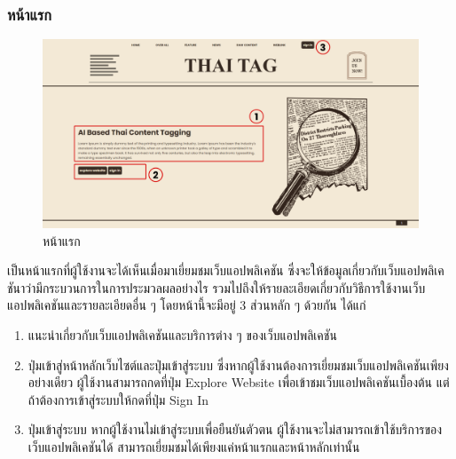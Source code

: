 \documentclass[12pt,oneside,openright,a4paper]{cpe-thai-project}
\begin{document}
\begin{itemize}
        \subsubsection{หน้าแรก}
          \begin{figure}[!ht]\centering
            \includegraphics[width=\textwidth]{./img/project_ui/4_1.png}
            \caption{หน้าแรก}\label{fig:exp_landing}
          \end{figure}
          \hspace{1cm}เป็นหน้าแรกที่ผู้ใช้งานจะได้เห็นเมื่อมาเยี่ยมชมเว็บแอปพลิเคชัน ซึ่งจะให้ข้อมูลเกี่ยวกับเว็บแอปพลิเคชันาว่ามีกระบวนการในการประมวลผลอย่างไร 
          รวมไปถึงให้รายละเอียดเกี่ยวกับวิธีการใช้งานเว็บแอปพลิเคชันและรายละเอียดอื่น ๆ โดยหน้านี้จะมีอยู่ 3 ส่วนหลัก ๆ ด้วยกัน ได้แก่
          \begin{enumerate}
            \item แนะนำเกี่ยวกับเว็บแอปพลิเคชันและบริการต่าง ๆ ของเว็บแอปพลิเคชัน
            \item ปุ่มเข้าสู่หน้าหลักเว็บไซต์และปุ่มเข้าสู่ระบบ ซึ่งหากผู้ใช้งานต้องการเยี่ยมชมเว็บแอปพลิเคชันเพียงอย่างเดียว ผู้ใช้งานสามารถกดที่ปุ่ม Explore Website
                  เพื่อเข้าชมเว็บแอปพลิเคชันเบื้องต้น แต่ถ้าต้องการเข้าสู่ระบบให้กดที่ปุ่ม Sign In
            \item ปุ่มเข้าสู่ระบบ หากผู้ใช้งานไม่เข้าสู่ระบบเพื่อยืนยันตัวตน ผู้ใช้งานจะไม่สามารถเข้าใช้บริการของเว็บแอปพลิเคชันได้ 
                  สามารถเยี่ยมชมได้เพียงแค่หน้าแรกและหน้าหลักเท่านั้น
          \end{enumerate}
          \newpage


\end{itemize}
\end{document}
